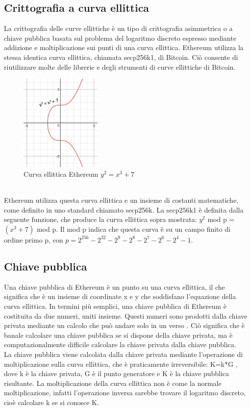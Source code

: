 \documentclass[a4paper,11pt]{report}
\begin{document}
\subsection{Crittografia a curva ellittica}
La crittografia delle curve ellittiche è un tipo di crittografia asimmetrica o a chiave pubblica basata sul problema del logaritmo discreto espresso mediante addizione e moltiplicazione sui punti di una curva ellittica.
Ethereum utilizza la stessa identica curva ellittica, chiamata secp256k1, di Bitcoin. Ciò consente di riutilizzare molte delle librerie e degli strumenti di curve ellittiche di Bitcoin.\\
\begin{figure}[htbp] 
\begin{center}
\includegraphics[width=4cm]{img/elliptic-curve.png} 
\end{center}
\caption{Curva ellittica Ethereum $y^{2}=x^{3}+7$}
\end{figure}
\\Ethereum utilizza questa curva ellittica e un insieme di costanti matematiche, come definito in uno standard chiamato secp256k. La secp256k1 è definita dalla seguente funzione, che produce la curva ellittica sopra mostrata: $y^{2}$ mod p = $(x^{3} +7)$  mod p. Il mod p indica che questa curva è su un campo finito di ordine primo p, con $p=2^{256}-2^{32}-2^{9}-2^{8}-2^{7}-2^{6}-2^{4}-1$. 

\subsection{Chiave pubblica}
Una chiave pubblica di Ethereum è un punto su una curva ellittica, il che significa che è un insieme di coordinate x e y che soddisfano l'equazione della curva ellittica.
In termini più semplici, una chiave pubblica di Ethereum è costituita da due numeri, uniti insieme. Questi numeri sono prodotti dalla chiave privata mediante un calcolo che può andare solo in un verso . Ciò significa che è banale calcolare una chiave pubblica se si dispone della chiave privata, ma è computazionalmente difficile calcolare la chiave privata dalla chiave pubblica.\\
La chiave pubblica viene calcolata dalla chiave privata mediante l'operazione di  moltiplicazione sulla curva ellittica, che è praticamente irreversibile: K=k*G , dove k è la chiave privata, G è il punto generatore e K è la chiave pubblica risultante.
La moltiplicazione della curva ellittica non è come la normale moltiplicazione, infatti l'operazione inversa sarebbe trovare il logaritmo discreto, cioè calcolare k se si conosce K.\\
\end{document}
